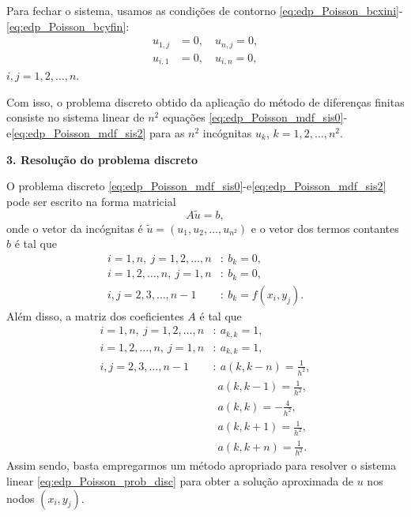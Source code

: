 Para fechar o sistema, usamos as condições de contorno \eqref{eq:edp_Poisson_bcxini}-\eqref{eq:edp_Poisson_bcyfin}:
\begin{align}
  u_{1,j} &= 0,\quad u_{n,j}=0,\label{eq:edp_Poisson_mdf_sis1}\\
  u_{i,1} &= 0,\quad u_{i,n}=0\label{eq:edp_Poisson_mdf_sis2},
\end{align}
$i,j=1, 2, \dotsc, n$.

Com isso, o problema discreto obtido da aplicação do método de diferenças finitas consiste no sistema linear de $n^2$ equações \eqref{eq:edp_Poisson_mdf_sis0}-e\eqref{eq:edp_Poisson_mdf_sis2} para as $n^2$ incógnitas $u_k$, $k=1, 2, \dotsc, n^2$.


\begin{flushleft}
  {\bf 3. Resolução do problema discreto}
\end{flushleft}

O problema discreto \eqref{eq:edp_Poisson_mdf_sis0}-e\eqref{eq:edp_Poisson_mdf_sis2} pode ser escrito na forma matricial
\begin{equation}
  A\tilde{u} = b,\label{eq:edp_Poisson_prob_disc}
\end{equation}
onde o vetor da incógnitas é $\tilde{u}=(u_1, u_2, \dotsc, u_{n^2})$ e o vetor dos termos contantes $b$ é tal que
\begin{align}
  i=1,n,~j=1, 2, \dotsc, n &:~b_k = 0,\\
  i=1, 2, \dotsc, n,~j=1,n &:~b_k = 0,\\
  i,j=2, 3, \dotsc, n-1 &:~b_k = f(x_i,y_j).
\end{align}
Além disso, a matriz dos coeficientes $A$ é tal que
\begin{align}
  i=1,n,~j=1, 2, \dotsc, n &:~a_{k,k} = 1,\\
  i=1, 2, \dotsc, n,~j=1,n &:~a_{k,k} = 1,\\
  i,j=2, 3, \dotsc, n-1 &:~a(k,k-n)=\frac{1}{h^2},\\
                        &~~a(k,k-1)=\frac{1}{h^2},\\
                        &~~a(k,k)=-\frac{4}{h^2},\\
                        &~~a(k,k+1)=\frac{1}{h^2},\\
                        &~~a(k,k+n)=\frac{1}{h^2}.
\end{align}
Assim sendo, basta empregarmos um método apropriado para resolver o sistema linear \eqref{eq:edp_Poisson_prob_disc} para obter a solução aproximada de $u$ nos nodos $(x_i, y_j)$.


